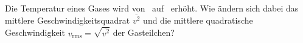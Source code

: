 Die Temperatur eines Gases wird von \thEiO\ auf \thZwO\ erhöht. Wie ändern sich dabei das mittlere Geschwindigkeitsquadrat $\overline{v^2}$ und die mittlere quadratische Geschwindigkeit $v_\text{rms} = \sqrt{\overline{v^2}}$ der Gasteilchen?
